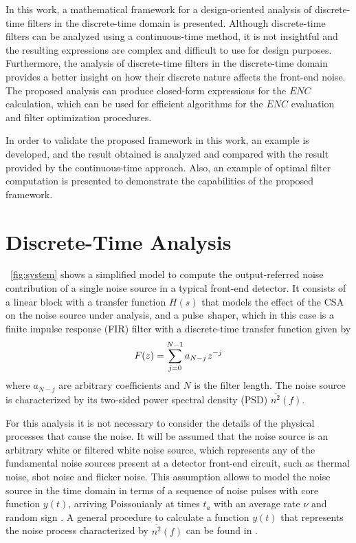 In this work, a mathematical framework for a \mbox{design-oriented} analysis of \mbox{discrete-time} filters in the \mbox{discrete-time} domain is presented. Although \mbox{discrete-time} filters can be analyzed using a \mbox{continuous-time} method, it is not insightful and the resulting expressions are complex and difficult to use for design purposes. Furthermore, the analysis of \mbox{discrete-time} filters in the \mbox{discrete-time} domain provides a better insight on how their discrete nature affects the \mbox{front-end} noise. The proposed analysis can produce \mbox{closed-form} expressions for the $\mathit{ENC}$ calculation, which can be used for efficient algorithms for the $\mathit{ENC}$ evaluation and filter optimization procedures.

In order to validate the proposed framework in this work, an example is developed, and the result obtained is analyzed and compared with the result provided by the \mbox{continuous-time} approach. Also, an example of optimal filter computation is presented to demonstrate the capabilities of the proposed framework.


\section{Discrete-Time Analysis}

\figurename~\ref{fig:system} shows a simplified model to compute the \mbox{output-referred} noise contribution of a single noise source in a typical \mbox{front-end} detector. It consists of a linear block with a transfer function $H(s)$ that models the effect of the CSA on the noise source under analysis, and a \mbox{pulse shaper}, which in this case is a finite impulse response (FIR) filter with a \mbox{discrete-time} transfer function given by
\begin{equation}
F(z) = \sum_{j=0}^{N-1}a_{N-j} \hspace{0.1em}z^{-j} \label{eq:FIRtf}
\end{equation}
where $a_{N-j}$ are arbitrary coefficients and $N$ is the filter length. The noise source is characterized by its \mbox{two-sided} power spectral density (PSD) $\overline{n^2}(f)$.

For this analysis it is not necessary to consider the details of the physical processes that cause the noise. It will be assumed that the noise source is an arbitrary white or filtered white noise source, which represents any of the fundamental noise sources present at a detector front-end circuit, such as thermal noise, shot noise and flicker noise. This assumption allows to model the noise source in the time domain in terms of a sequence of noise pulses with core function $y(t)$, arriving Poissonianly at times $t_a$ with an average rate $\nu$ and random sign \citep{radeka101, goulding101}. A general procedure to calculate a function $y(t)$ that represents the noise process characterized by $\overline{n^2}(f)$ can be found in \citep{pullia102}.

